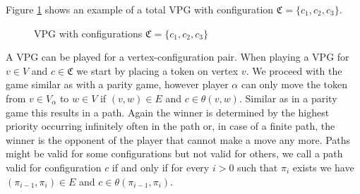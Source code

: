 \begin{example}
	Figure \ref{fig:vpg_basicex} shows an example of a total VPG with configuration $\mathfrak{C} = \{c_1,c_2,c_3\}$.
	\begin{figure}[h]
		\centering
		\caption{VPG with configurations $\mathfrak{C} = \{c_1,c_2,c_3\}$}
		\label{fig:vpg_basicex}
	\end{figure}
\end{example}

A VPG can be played for a vertex-configuration pair. When playing a VPG for $v\in V$ and $c \in \mathfrak{C}$ we start by placing a token on vertex $v$. We proceed with the game similar as with a parity game, however player $\alpha$ can only move the token from $v \in V_\alpha$ to $w \in V$ if $(v,w) \in E$ and $c \in \theta(v,w)$. Similar as in a parity game this results in a path. Again the winner is determined by the highest priority occurring infinitely often in the path or, in case of a finite path, the winner is the opponent of the player that cannot make a move any more. Paths might be valid for some configurations but not valid for others, we call a path valid for configuration $c$ if and only if for every $i > 0$ such that $\pi_i$ exists we have $(\pi_{i-1},\pi_{i}) \in E$ and $c \in \theta(\pi_{i-1},\pi_{i})$.

